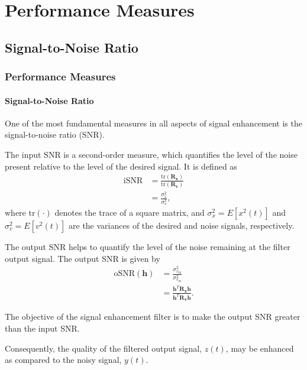 \documentclass[10pt,pdflatex,headrule,landscape]{beamer}
\begin{document}
\section{Performance Measures}
\subsection{Signal-to-Noise Ratio}
\begin{frame}
    \frametitle{Performance Measures}
    \framesubtitle{Signal-to-Noise Ratio}

One of the most fundamental measures in all aspects of signal enhancement is the signal-to-noise ratio (SNR).

The input SNR is a second-order measure, which quantifies the level of the noise present relative to the level of the desired signal. It is defined as
\begin{align}
\label{C2-iSNR}
 \mathrm{iSNR} &= \frac{\mathrm{tr}\left( \mathbf{R}_{\mathbf{x}} \right)}{\mathrm{tr}\left( \mathbf{R}_{\mathbf{v}} \right)} \\
 &= \frac{\sigma_x^2}{\sigma_v^2}, \nonumber
\end{align}
where $\mathrm{tr}(\cdot)$ denotes the trace of a square matrix, and $\sigma_{x}^2 = E \left[ x^2(t) \right]$ and $\sigma_{v}^2 = E \left[ v^2(t) \right]$ are the variances of the desired and noise signals, respectively.

\end{frame}
\begin{frame}

The output SNR helps to quantify the level of the noise remaining at the filter output signal. The output SNR is given by
\begin{align}
\label{C2-oSNR}
 \mathrm{oSNR}\left( \mathbf{h} \right) &= \frac{ \sigma_{x_{\mathrm{fd}}}^2 } { \sigma_{v_{\mathrm{rn}}}^2 } \\
 &= \frac{ \mathbf{h}^T \mathbf{R}_{\mathbf{x}} \mathbf{h} } { \mathbf{h}^T \mathbf{R}_{\mathbf{v}} \mathbf{h} } . \nonumber
\end{align}

The objective of the signal enhancement filter is to make the output SNR greater than the input SNR.

Consequently, the quality of the filtered output signal, $z(t)$, may be enhanced as compared to the noisy signal, $y(t)$.

\end{frame}
\end{document}
